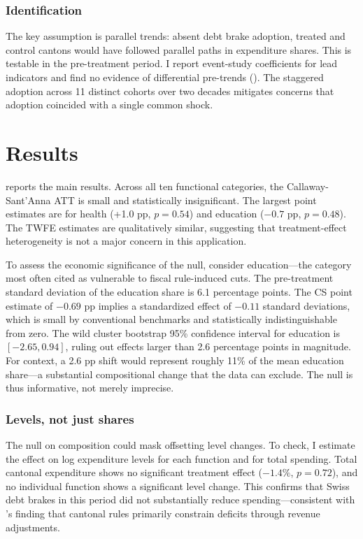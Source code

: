 \documentclass[12pt]{article}
\begin{document}
\subsubsection*{Identification} The key assumption is parallel trends: absent debt brake adoption, treated and control cantons would have followed parallel paths in expenditure shares. This is testable in the pre-treatment period. I report event-study coefficients for lead indicators and find no evidence of differential pre-trends (). The staggered adoption across 11 distinct cohorts over two decades mitigates concerns that adoption coincided with a single common shock.


\section{Results}\label{sec:results}

 reports the main results. Across all ten functional categories, the Callaway-Sant'Anna ATT is small and statistically insignificant. The largest point estimates are for health (+1.0 pp, $p = 0.54$) and education ($-0.7$ pp, $p = 0.48$). The TWFE estimates are qualitatively similar, suggesting that treatment-effect heterogeneity is not a major concern in this application.



To assess the economic significance of the null, consider education---the category most often cited as vulnerable to fiscal rule-induced cuts. The pre-treatment standard deviation of the education share is 6.1 percentage points. The CS point estimate of $-0.69$ pp implies a standardized effect of $-0.11$ standard deviations, which is small by conventional benchmarks and statistically indistinguishable from zero. The wild cluster bootstrap 95\% confidence interval for education is $[-2.65, 0.94]$, ruling out effects larger than 2.6 percentage points in magnitude. For context, a 2.6 pp shift would represent roughly 11\% of the mean education share---a substantial compositional change that the data can exclude. The null is thus informative, not merely imprecise.

\subsubsection*{Levels, not just shares} The null on composition could mask offsetting level changes. To check, I estimate the effect on log expenditure levels for each function and for total spending. Total cantonal expenditure shows no significant treatment effect ($-1.4\%$, $p = 0.72$), and no individual function shows a significant level change. This confirms that Swiss debt brakes in this period did not substantially reduce spending---consistent with \citet{luechinger2013fiscal}'s finding that cantonal rules primarily constrain deficits through revenue adjustments.
\end{document}
